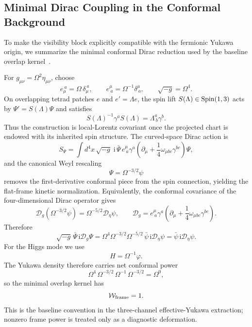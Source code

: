 \documentclass[aps,prd,onecolumn,notitlepage,nofootinbib,superscriptaddress,11pt,floatfix]{revtex4-2}
\newcommand{\ii}{\mathrm{i}}
\begin{document}
\subsection{Minimal Dirac Coupling in the Conformal Background}
\label{app:dirac_conformal}

To make the visibility block explicitly compatible with the fermionic Yukawa origin, we summarize the minimal conformal Dirac reduction used by the baseline overlap kernel~\cite{BirrellDavies1982,LawsonMichelsohn1989}.

For $g_{\mu\nu}=\Omega^2\eta_{\mu\nu}$, choose
\begin{equation}
e_\mu^{\ a}=\Omega\,\delta_\mu^{\ a},\qquad
e^\mu_{\ a}=\Omega^{-1}\delta^\mu_{\ a},\qquad
\sqrt{-g}=\Omega^4.
\end{equation}
On overlapping tetrad patches \(e\) and \(e'=\Lambda e\), the spin lift \(S(\Lambda)\in{\rm Spin}(1,3)\) acts by \(\Psi'=S(\Lambda)\Psi\) and satisfies
\begin{equation}
S(\Lambda)^{-1}\gamma^a S(\Lambda)=\Lambda^a_{\ b}\gamma^b .
\end{equation}
Thus the construction is local-Lorentz covariant once the projected chart is endowed with its inherited spin structure.
The curved-space Dirac action is
\begin{equation}
S_\Psi=\int d^4x\,\sqrt{-g}\;\ii\,\bar{\Psi}\,e^\mu_{\ a}\gamma^a\!
\left(\partial_\mu+\frac{1}{4}\omega_{\mu bc}\gamma^{bc}\right)\!\Psi,
\end{equation}
and the canonical Weyl rescaling
\begin{equation}
\Psi=\Omega^{-3/2}\psi
\end{equation}
removes the first-derivative conformal piece from the spin connection, yielding the flat-frame kinetic normalization.
Equivalently, the conformal covariance of the four-dimensional Dirac operator gives
\begin{equation}
\mathcal D_g(\Omega^{-3/2}\psi)=\Omega^{-5/2}\mathcal D_\eta\psi,
\qquad
\mathcal D_g=e^\mu_{\ a}\gamma^a\left(\partial_\mu+\frac14\omega_{\mu bc}\gamma^{bc}\right).
\end{equation}
Therefore
\begin{equation}
\sqrt{-g}\,\bar\Psi\,\ii\mathcal D_g\Psi
=
\Omega^4\Omega^{-3/2}\Omega^{-5/2}\,
\bar\psi\,\ii\mathcal D_\eta\psi
=\bar\psi\,\ii\mathcal D_\eta\psi.
\end{equation}
For the Higgs mode we use
\begin{equation}
H=\Omega^{-1}\varphi.
\end{equation}
The Yukawa density therefore carries net conformal power
\begin{equation}
\Omega^{4}\,\Omega^{-3/2}\,\Omega^{-1}\,\Omega^{-3/2}=\Omega^0,
\end{equation}
so the minimal overlap kernel has
\begin{equation}
\mathcal{W}_{\rm frame}=1.
\end{equation}
This is the baseline convention in the three-channel effective-Yukawa extraction; nonzero frame power is treated only as a diagnostic deformation.
\end{document}
